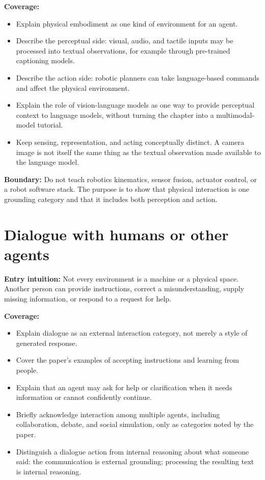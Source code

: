 \textbf{Coverage:}
\begin{itemize}
  \item Explain physical embodiment as one kind of environment for an agent.
  \item Describe the perceptual side: visual, audio, and tactile inputs may be processed into textual observations, for example through pre-trained captioning models.
  \item Describe the action side: robotic planners can take language-based commands and affect the physical environment.
  \item Explain the role of vision-language models as one way to provide perceptual context to language models, without turning the chapter into a multimodal-model tutorial.
  \item Keep sensing, representation, and acting conceptually distinct. A camera image is not itself the same thing as the textual observation made available to the language model.
\end{itemize}

\textbf{Boundary:} Do not teach robotics kinematics, sensor fusion, actuator control, or a robot software stack. The purpose is to show that physical interaction is one grounding category and that it includes both perception and action. 

\section{Dialogue with humans or other agents}
\textbf{Entry intuition:} Not every environment is a machine or a physical space. Another person can provide instructions, correct a misunderstanding, supply missing information, or respond to a request for help.

\textbf{Coverage:}
\begin{itemize}
  \item Explain dialogue as an external interaction category, not merely a style of generated response.
  \item Cover the paper's examples of accepting instructions and learning from people.
  \item Explain that an agent may ask for help or clarification when it needs information or cannot confidently continue.
  \item Briefly acknowledge interaction among multiple agents, including collaboration, debate, and social simulation, only as categories noted by the paper.
  \item Distinguish a dialogue action from internal reasoning about what someone said: the communication is external grounding; processing the resulting text is internal reasoning.
\end{itemize}


